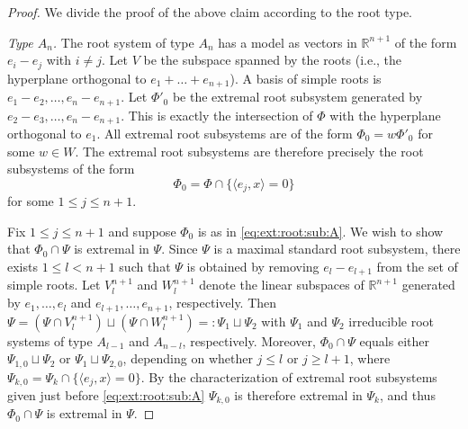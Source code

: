 \documentclass[12pt]{amsart}
\theoremstyle{remark}
\begin{document}
\begin{proof}
We divide the proof of the above claim according to the root type.

\medskip

\noindent \textit{Type $A_n$.} The root system of type $A_n$ has a model as vectors in $\mathbb{R}^{n+1}$ of the form $e_i - e_j$ with $i \neq j$. Let $V$ be the subspace spanned by the roots (i.e., the hyperplane orthogonal to $e_1 + \dots + e_{n+1}$). A basis of simple roots is $e_1 - e_2, \dots, e_{n} - e_{n+1}$. Let $\Phi'_0$ be the extremal root subsystem generated by $e_2 - e_3, \dots, e_n - e_{n+1}$. This is exactly the intersection of $\Phi$ with the hyperplane orthogonal to $e_1$. All extremal root subsystems are of the form $\Phi_0=w \Phi'_0$ for some $w\in W$. The extremal root subsystems are therefore precisely the root subsystems of the form
\begin{equation}\label{eq:ext:root:sub:A}
\Phi_0 =\Phi\cap \{\langle e_j, x \rangle = 0\}
\end{equation} 
for some $1\leq j\leq n+1$.

Fix $1\leq j\leq n+1$ and suppose $\Phi_0$ is as in \eqref{eq:ext:root:sub:A}.
    We wish to show that $\Phi_0\cap \Psi$ is extremal in $\Psi$. Since $\Psi$ is a maximal standard root subsystem, there exists $1\leq l<n+1$ such that $\Psi$ is obtained by removing $e_l-e_{l+1}$ from the set of simple roots. 
    Let $V^{n+1}_l$ and $W^{n+1}_l$ denote the linear subspaces of $\mathbb{R}^{n+1}$ generated by $e_1,\ldots, e_l$ and $e_{l+1},\ldots,e_{n+1}$, respectively. Then $\Psi=(\Psi\cap V^{n+1}_l) \sqcup (\Psi\cap W^{n+1}_l)=:\Psi_1\sqcup\Psi_2$ with  $\Psi_1$ and $\Psi_2$ irreducible root systems of type $A_{l-1}$ and $A_{n-l}$, respectively. Moreover, $\Phi_0\cap \Psi$ equals either $\Psi_{1,0}\sqcup\Psi_2$ or $\Psi_1\sqcup \Psi_{2,0}$, depending on whether $j\le l$ or $j\ge l+1$, where $\Psi_{k,0}=\Psi_k\cap \{\langle e_j, x \rangle = 0\}$. By the characterization of extremal root subsystems given just before \eqref{eq:ext:root:sub:A} $\Psi_{k,0}$ is therefore extremal in $\Psi_k$, and thus $\Phi_0\cap \Psi$ is extremal in $\Psi$.
    

\end{proof}
\end{document}
